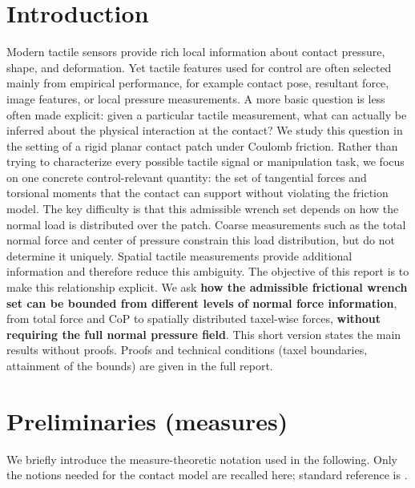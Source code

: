 \documentclass[11pt,a4paper]{article}
\theoremstyle{plain}
\begin{document}
\section{Introduction}
Modern tactile sensors provide rich local information about contact pressure, shape, and deformation. Yet tactile features used for control are often selected mainly from empirical performance, for example contact pose, resultant force, image features, or local pressure measurements. A more basic question is less often made explicit: given a particular tactile measurement, what can actually be inferred about the physical interaction at the contact?
We study this question in the setting of a rigid planar contact patch under Coulomb friction. Rather than trying to characterize every possible tactile signal or manipulation task, we focus on one concrete control-relevant quantity: the set of tangential forces and torsional moments that the contact can support without violating the friction model.
The key difficulty is that this admissible wrench set depends on how the normal load is distributed over the patch. Coarse measurements such as the total normal force and center of pressure constrain this load distribution, but do not determine it uniquely. Spatial tactile measurements provide additional information and therefore reduce this ambiguity.
The objective of this report is to make this relationship explicit. We ask \textbf{how the admissible frictional wrench set can be bounded from different levels of normal force information}, from total force and CoP to spatially distributed taxel-wise forces, \textbf{without requiring the full normal pressure field}.
This short version states the main results without proofs. Proofs and technical conditions (taxel boundaries, attainment of the bounds) are given in the full report.

\section{Preliminaries (measures)}
\label{sec:measure-preliminaries}

We briefly introduce the measure-theoretic notation used in the following.
Only the notions needed for the contact model are recalled here; standard reference
is \cite{evans2015measure}.
\end{document}
